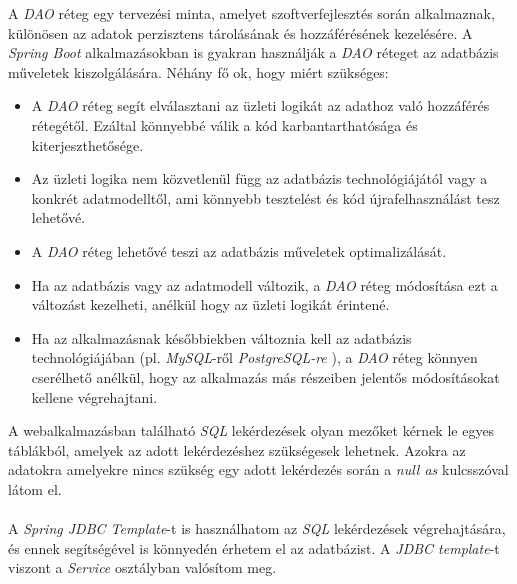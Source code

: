 
A \textit{DAO} \cite{DAO} réteg egy tervezési minta, amelyet szoftverfejlesztés során alkalmaznak, különösen az adatok perzisztens tárolásának és hozzáférésének kezelésére. A \textit{Spring Boot} \cite{spring_boot} alkalmazásokban is gyakran használják a \textit{DAO} \cite{DAO} réteget az adatbázis műveletek kiszolgálására. Néhány fő ok, hogy miért szükséges:

\begin{itemize}

\item{} A \textit{DAO} réteg segít elválasztani az üzleti logikát az adathoz való hozzáférés rétegétől. Ezáltal könnyebbé válik a kód karbantarthatósága és kiterjeszthetősége. 

\item{} Az üzleti logika nem közvetlenül függ az adatbázis technológiájától vagy a konkrét adatmodelltől, ami könnyebb tesztelést és kód újrafelhasználást tesz lehetővé. 

\item{} A \textit{DAO} réteg lehetővé teszi az adatbázis műveletek optimalizálását. 

\item{} Ha az adatbázis vagy az adatmodell változik, a \textit{DAO} réteg módosítása ezt a változást kezelheti, anélkül hogy az üzleti logikát érintené. 

\item{} Ha az alkalmazásnak későbbiekben változnia kell az adatbázis technológiájában (pl. \textit{MySQL}-ről \cite{MySQL} \textit{PostgreSQL-re} \cite{PostgreSQL}), a \textit{DAO} réteg könnyen cserélhető anélkül, hogy az alkalmazás más részeiben jelentős módosításokat kellene végrehajtani.

\end{itemize}

A webalkalmazásban található \textit{SQL} lekérdezések olyan mezőket kérnek le egyes táblákból, amelyek az adott lekérdezéshez szükségesek lehetnek. Azokra az adatokra amelyekre nincs szükség egy adott lekérdezés során a \textit{null as} kulcsszóval látom el.\\
\\
A \textit{Spring JDBC Template}-t \cite{JdbcTemplate} is használhatom az \textit{SQL} lekérdezések végrehajtására, és ennek segítségével is könnyedén érhetem el az adatbázist. A \textit{JDBC template}-t viszont a \textit{Service} osztályban valósítom meg.


